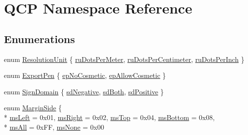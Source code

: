 \hypertarget{namespaceQCP}{}\section{Q\+CP Namespace Reference}
\label{namespaceQCP}
\subsection*{Enumerations}
\begin{DoxyCompactItemize}
\item 
enum \hyperlink{namespaceQCP_a715d46153da230990aa887d0f0602452}{Resolution\+Unit} \{ \hyperlink{namespaceQCP_a715d46153da230990aa887d0f0602452a707d005dea5c4ab694e4270d9c6094e8}{ru\+Dots\+Per\+Meter}, 
\hyperlink{namespaceQCP_a715d46153da230990aa887d0f0602452a4224e01f49b331489ad8cb12b619b229}{ru\+Dots\+Per\+Centimeter}, 
\hyperlink{namespaceQCP_a715d46153da230990aa887d0f0602452affb887d8efe79c39a1aca2acd7002afc}{ru\+Dots\+Per\+Inch}
 \}
\item 
enum \hyperlink{namespaceQCP_a17844f19e1019693a953e1eb93536d2f}{Export\+Pen} \{ \hyperlink{namespaceQCP_a17844f19e1019693a953e1eb93536d2faae8fcfaafee234ce18558afef83f6a78}{ep\+No\+Cosmetic}, 
\hyperlink{namespaceQCP_a17844f19e1019693a953e1eb93536d2fa50d3657dba3fb90560b93a823cb0a6e8}{ep\+Allow\+Cosmetic}
 \}
\item 
enum \hyperlink{namespaceQCP_afd50e7cf431af385614987d8553ff8a9}{Sign\+Domain} \{ \hyperlink{namespaceQCP_afd50e7cf431af385614987d8553ff8a9a2d18af0bc58f6528d1e82ce699fe4829}{sd\+Negative}, 
\hyperlink{namespaceQCP_afd50e7cf431af385614987d8553ff8a9aa38352ef02d51ddfa4399d9551566e24}{sd\+Both}, 
\hyperlink{namespaceQCP_afd50e7cf431af385614987d8553ff8a9a584784b75fb816abcc627cf743bb699f}{sd\+Positive}
 \}
\item 
enum \hyperlink{namespaceQCP_a7e487e3e2ccb62ab7771065bab7cae54}{Margin\+Side} \{ \\*
\hyperlink{namespaceQCP_a7e487e3e2ccb62ab7771065bab7cae54a9500c8bfcc9e80b9dff0a8e00e867f07}{ms\+Left} = 0x01, 
\hyperlink{namespaceQCP_a7e487e3e2ccb62ab7771065bab7cae54a93c719593bb2b94ed244d52c86d83b65}{ms\+Right} = 0x02, 
\hyperlink{namespaceQCP_a7e487e3e2ccb62ab7771065bab7cae54a5db8fb0d0b0ecf0d611c2602a348e8a0}{ms\+Top} = 0x04, 
\hyperlink{namespaceQCP_a7e487e3e2ccb62ab7771065bab7cae54a5241d8eac2bab9524a38889f576179cc}{ms\+Bottom} = 0x08, 
\\*
\hyperlink{namespaceQCP_a7e487e3e2ccb62ab7771065bab7cae54a43d7361cb0c5244eabdc962021bffebc}{ms\+All} = 0x\+FF, 
\hyperlink{namespaceQCP_a7e487e3e2ccb62ab7771065bab7cae54a80aa4149f16dabd538f8b2e3d42c42d5}{ms\+None} = 0x00

\end{DoxyCompactItemize}
